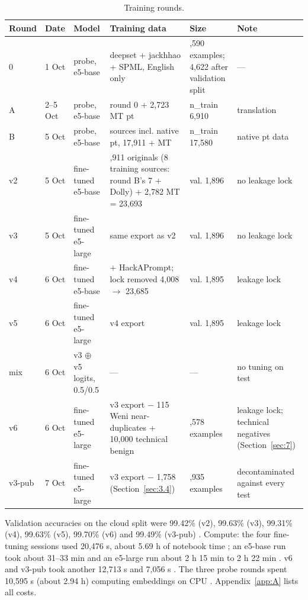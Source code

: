 \documentclass[11pt]{article}
\begin{document}
\begin{table}[tbp]
\centering
\small
\caption{Training rounds.}\label{tab:3}
\begin{tabularx}{\linewidth}{@{}ll>{\raggedright\arraybackslash\hsize=0.85\hsize}X>{\raggedright\arraybackslash\hsize=1.63\hsize}X>{\raggedright\arraybackslash\hsize=0.68\hsize}X>{\raggedright\arraybackslash\hsize=0.84\hsize}X@{}}
\toprule
Round & Date & Model & Training data & Size & Note \\
\midrule
0 & 1 Oct & probe, e5-base & deepset + jackhhao + SPML, English only & 5,590 examples; 4,622 after validation split %
 & — \\
A & 2–5 Oct & probe, e5-base & round 0 + 2,723 MT pt %
 & n\_train 6,910 %
 & translation \\
B & 5 Oct & probe, e5-base & 7 sources incl. native pt, 17,911 + MT %
 & n\_train 17,580 %
 & native pt data \\
v2 & 5 Oct & fine-tuned e5-base & 20,911 originals (8 training sources: round B's 7 + Dolly) + 2,782 MT = 23,693 %
 & val. 1,896 %
 & no leakage lock %
 \\
v3 & 5 Oct & fine-tuned e5-large & same export as v2 %
 & val. 1,896 %
 & no leakage lock \\
v4 & 6 Oct & fine-tuned e5-base & + HackAPrompt; lock removed 4,008 \ensuremath{\rightarrow} 23,685 %
 & val. 1,895 %
 & leakage lock \\
v5 & 6 Oct & fine-tuned e5-large & v4 export %
 & val. 1,895 %
 & leakage lock \\
mix & 6 Oct & v3 \ensuremath{\oplus} v5 logits, 0.5/0.5 %
 & — & — & no tuning on test \\
v6 & 6 Oct & fine-tuned e5-large & v3 export \ensuremath{-} 115 Weni near-duplicates + 10,000 technical benign %
 & 33,578 examples & leakage lock; technical negatives (Section~\ref{sec:7}) \\
v3-pub & 7 Oct & fine-tuned e5-large & v3 export \ensuremath{-} 1,758 (Section~\ref{sec:3.4}) %
 & 21,935 examples & decontaminated against every test \\
\bottomrule
\end{tabularx}
\end{table}

Validation accuracies on the cloud split were 99.42\% (v2), 99.63\% (v3), 99.31\% (v4), 99.63\% (v5), 99.70\% (v6) and 99.49\% (v3-pub)%
. Compute: the four fine-tuning sessions used 20,476 s, about 5.69 h of notebook time%
; an e5-base run took about 31–33 min and an e5-large run about 2 h 15 min to 2 h 22 min%
. v6 and v3-pub took another 12,713 s and 7,056 s%
. The three probe rounds spent 10,595 s (about 2.94 h) computing embeddings on CPU%
. Appendix~\ref{app:A} lists all costs.
\end{document}
